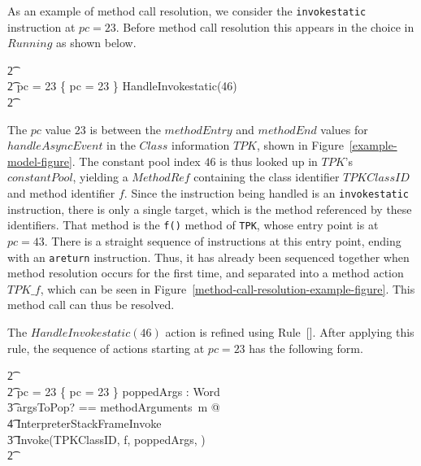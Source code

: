 As an example of method call resolution, we consider the
\texttt{invokestatic} instruction at $pc = 23$. 
Before method call resolution this appears in the choice in $Running$
as shown below.
\begin{circusaction}
  \t2 {} \cdots {} \\
  \t2 {} \circelse pc = 23 \circthen \{ pc = 23 \} \circseq HandleInvokestatic(46) \\
  \t2 {} \cdots {} \\
\end{circusaction}
The $pc$ value $23$ is between the $methodEntry$ and $methodEnd$
values for $handleAsyncEvent$ in the $Class$ information $TPK$, shown
in Figure~\ref{example-model-figure}.
The constant pool index $46$ is thus looked up in $TPK$'s
$constantPool$, yielding a $MethodRef$ containing the class identifier
$TPKClassID$ and method identifier $f$.
Since the instruction being handled is an \texttt{invokestatic}
instruction, there is only a single target, which is the method
referenced by these identifiers.
That method is the \texttt{f()} method of \texttt{TPK}, whose entry
point is at $pc = 43$.
There is a straight sequence of instructions at this entry point,
ending with an \texttt{areturn} instruction. 
Thus, it has already been sequenced together when method resolution
occurs for the first time, and separated into a method action
$TPK\_f$, which can be seen in
Figure~\ref{method-call-resolution-example-figure}.
This method call can thus be resolved.

The $HandleInvokestatic(46)$ action is refined using
Rule~[].
After applying this rule, the sequence of actions starting at
$pc = 23$ has the following form.
\begin{circusaction}
  \t2 {} \cdots {} \\
  \t2 {} \circelse pc = 23 \circthen \{ pc = 23 \} \circseq \circvar poppedArgs : \seq Word \circspot \\
  \t3 \lschexpract \exists argsToPop? == methodArguments~m @ \\
  \t4 InterpreterStackFrameInvoke \rschexpract \circseq \\
  \t3 Invoke(TPKClassID, f, poppedArgs, \true) \\
  \t2 {} \cdots {}
\end{circusaction}

